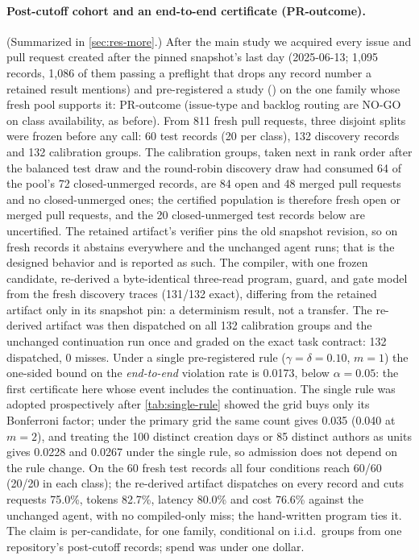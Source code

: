 \paragraph{Post-cutoff cohort and an end-to-end certificate (PR-outcome).}
(Summarized in \cref{sec:res-more}.) After the main study we acquired every  issue and pull
request created after the pinned snapshot's last day (2025-06-13; 1{,}095
records, 1{,}086 of them passing a preflight that drops any record number a
retained result mentions) and pre-registered a study
() on the one
family whose fresh pool supports it: PR-outcome (issue-type and backlog
routing are NO-GO on class availability, as before). From 811 fresh pull
requests, three disjoint splits were frozen before any call: 60 test records
(20 per class), 132 discovery records and 132 calibration groups. The
calibration groups, taken next in rank order after the balanced test draw and
the round-robin discovery draw had consumed 64 of the pool's 72
closed-unmerged records, are 84 open and 48 merged pull requests and no
closed-unmerged ones; the certified population is therefore fresh open or
merged pull requests, and the 20 closed-unmerged test records below are
uncertified. The
retained artifact's verifier pins the old snapshot revision, so on fresh
records it abstains everywhere and the unchanged agent runs; that is the
designed behavior and is reported as such. The compiler, with one frozen
candidate, re-derived a byte-identical three-read program, guard, and gate
model from the fresh discovery traces (131/132 exact), differing from the
retained artifact only in its snapshot pin: a determinism result, not a
transfer. The
re-derived artifact was then dispatched on all 132 calibration groups and the
unchanged continuation run once and graded on the exact task contract: 132
dispatched, 0 misses. Under a single pre-registered rule ($\gamma=\delta=0.10$,
$m=1$) the one-sided bound on the \emph{end-to-end} violation rate is
0.0173, below $\alpha=0.05$: the first certificate here whose event includes
the continuation. The single rule was adopted prospectively after
\cref{tab:single-rule} showed the grid buys only its Bonferroni factor; under
the primary grid the same count gives 0.035 (0.040 at $m=2$), and treating the
100 distinct creation days or 85 distinct authors as units gives 0.0228 and
0.0267 under the single rule, so admission does not depend on the rule change.
On the 60 fresh test records all four conditions reach
60/60 (20/20 in each class); the re-derived artifact dispatches on every record and cuts requests
75.0\%, tokens 82.7\%, latency 80.0\% and cost 76.6\% against the unchanged
agent, with no compiled-only miss; the hand-written program ties it. The
claim is per-candidate, for one family, conditional on i.i.d.\ groups from
one repository's post-cutoff records; spend was under one dollar.

